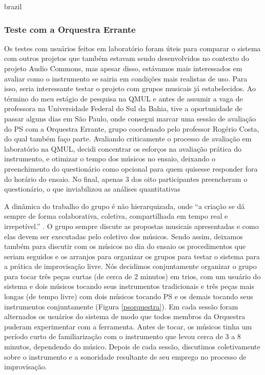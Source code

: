 \begin{otherlanguage*}{brazil}
\subsubsection{Teste com a Orquestra Errante}
Os testes com usuários feitos em laboratório foram úteis para comparar o sistema com outros projetos que também estavam sendo desenvolvidos no contexto do projeto Audio Commons, mas apesar disso, estávamos mais interessados em avaliar como o instrumento se sairia em condições mais realistas de uso. Para isso, seria interessante testar o projeto com grupos musicais já estabelecidos. Ao término do meu estágio de pesquisa na QMUL e antes de assumir a vaga de professora na Universidade Federal do Sul da Bahia, tive a oportunidade de passar alguns dias em São Paulo, onde consegui marcar uma sessão de avaliação do PS com a Orquestra Errante, grupo coordenado pelo professor Rogério Costa, do qual também faço parte. Avaliando criticamente o processo de avaliação em laboratório na QMUL, decidi concentrar os esforços na avaliação prática do instrumento, e otimizar o tempo dos músicos no ensaio, deixando o preenchimento do questionário como opcional para quem quisesse responder fora do horário do ensaio. No final, apenas 3 dos oito participantes preencheram o questionário, o que inviabilizou as análises quantitativas

A dinâmica do trabalho do grupo é não hierarquizada, onde ``a criação se dá sempre de forma colaborativa, coletiva, compartilhada em tempo real e irrepetível.'' \cite{costa2013orquestra}. O grupo sempre discute as propostas musicais apresentadas e como elas devem ser executadas pelo coletivo dos músicos. Sendo assim, deixamos também para discutir com os músicos no dia do ensaio os procedimentos que seriam seguidos e os arranjos para organizar os grupos para testar o sistema para a prática de improvisação livre. Nós decidimos conjuntamente organizar o grupo para tocar três peças curtas (de cerca de 2 minutos) em trios, com um usuário do sistema e dois músicos tocando seus instrumentos tradicionais e três peças mais longas (de tempo livre) com dois músicos tocando PS e os demais tocando seus instrumentos conjuntamente (Figura \ref{psorquestra}). Em cada sessão foram alternados os usuários do sistema de modo que todos membros da Orquestra puderam experimentar com a ferramenta. Antes de tocar, os músicos tinha um período curto de familiarização com o instrumento que levou cerca de 3 a 8 minutos, dependendo do músico. Depois de cada sessão, discutimos coletivamente sobre o instrumento e a sonoridade resultante de seu emprego no processo de improvisação.



\end{otherlanguage*}
